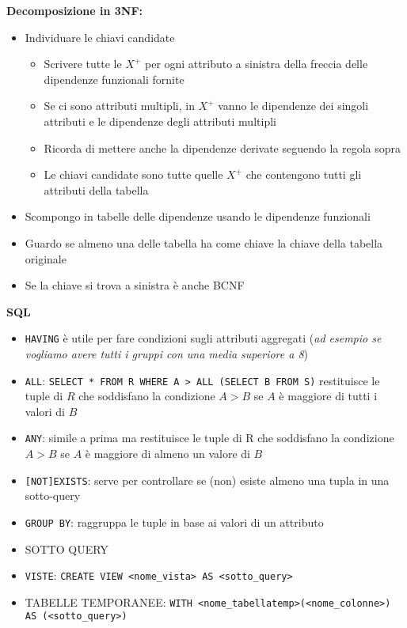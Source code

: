 \documentclass[10pt]{article}
\begin{document}
\textbf{Decomposizione in 3NF:}
\begin{itemize}
    \item Individuare le chiavi candidate \begin{itemize}
        \item Scrivere tutte le $X^{+}$ per ogni attributo a sinistra della freccia delle dipendenze funzionali fornite
        \item Se ci sono attributi multipli, in $X^{+}$ vanno le dipendenze dei singoli attributi e le dipendenze degli attributi multipli
        \item Ricorda di mettere anche la dipendenze derivate seguendo la regola sopra
        \item Le chiavi candidate sono tutte quelle $X^{+}$ che contengono tutti gli attributi della tabella
    \end{itemize}
    \item Scompongo in tabelle delle dipendenze usando le dipendenze funzionali
    \item Guardo se almeno una delle tabella ha come chiave la chiave della tabella originale
    \item Se la chiave si trova a sinistra è anche BCNF
\end{itemize}
\textbf{SQL}
\begin{itemize}
    \item \texttt{HAVING} è utile per fare condizioni sugli attributi aggregati (\textit{ad esempio se vogliamo avere tutti i gruppi con una media superiore a 8})
    \item \texttt{ALL}: \texttt{SELECT * FROM R WHERE A > ALL (SELECT B FROM S)} restituisce le tuple di $R$ che soddisfano la condizione $A>B$ se $A$ è maggiore di tutti i valori di $B$
    \item \texttt{ANY}: simile a prima ma restituisce le tuple di R che soddisfano la condizione $A>B$ se $A$ è maggiore di almeno un valore di $B$
    \item \texttt{[NOT]EXISTS}: serve per controllare se (non) esiste almeno una tupla in una sotto-query
    \item \texttt{GROUP BY}: raggruppa le tuple in base ai valori di un attributo
    \item SOTTO QUERY
    \item \texttt{VISTE}: \texttt{CREATE VIEW <nome\_vista> AS <sotto\_query>}
    \item TABELLE TEMPORANEE: \texttt{WITH <nome\_tabellatemp>(<nome\_colonne>) AS (<sotto\_query>)}
\end{itemize}
\end{document}
